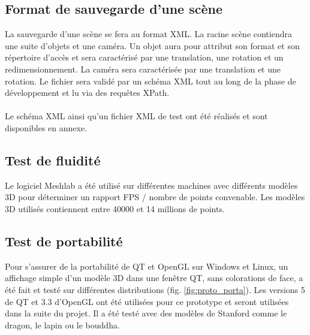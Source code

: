 \subsection{Format de sauvegarde d'une scène}

La sauvegarde d’une scène se fera au format XML. La racine scène contiendra une suite d’objets et une caméra. Un objet aura pour attribut son format et son répertoire d’accès et sera caractérisé par une translation, une rotation et un redimensionnement. La caméra sera caractérisée par une translation et une rotation. Le fichier sera validé par un schéma XML tout au long de la phase de développement et lu via des requêtes XPath.

\paragraph{}
Le schéma XML ainsi qu’un fichier XML de test ont été réalisés et sont disponibles en annexe.

\subsection{Test de fluidité}

Le logiciel Meshlab a été utilisé sur différentes machines avec différents modèles 3D pour déterminer un rapport FPS / nombre de points convenable. Les modèles 3D utilisés contiennent entre 40000 et 14 millions de points.

\subsection{Test de portabilité}

Pour s’assurer de la portabilité de QT et OpenGL sur Windows et Linux, un affichage simple d’un modèle 3D dans une fenêtre QT, sans colorations de face, a été fait et testé sur différentes distributions (fig. \ref{fig:proto_porta}). Les versions 5 de QT et 3.3 d’OpenGL ont été utilisées pour ce prototype et seront utilisées dans la suite du projet. Il a été testé avec des modèles de Stanford comme le dragon, le lapin ou le bouddha.

